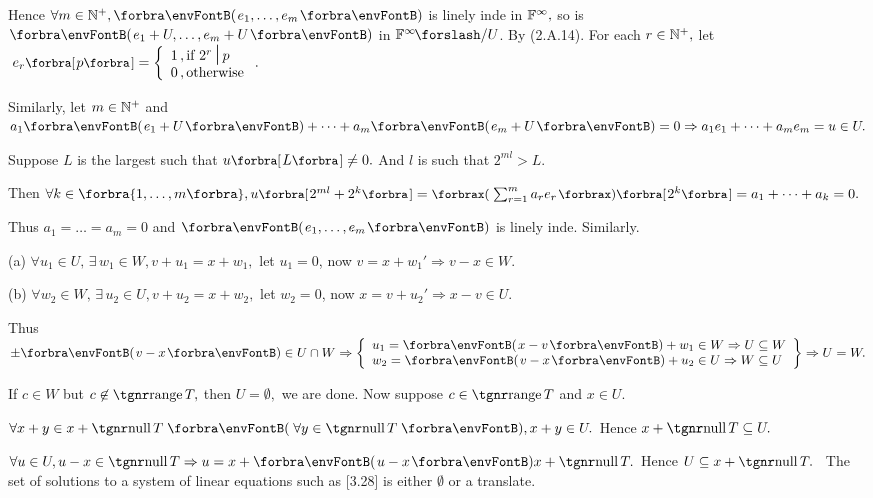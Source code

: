 \documentclass[a4paper, 11pt, UTF8]{article}
\begin{document}
\begin{large}
Hence $\forall m\in\Nbp,\Par{e_1,\dots,e_m}$ is linely inde in ${\mathbb{F}}^{\infty},$ so is $\Par{e_1+U,\dots,e_m+U}$ in $\Fbb^{\infty}\mySlash U$. By (2.A.14).\PfEnd\vspace{14pt}\quad
\Or For each $r\in{\mathbb{N}^+},$ let $\;e_r\Sbra{p}=\hMath[0pt]{l}{\left\{}{\right.}{1\,,\text{if }2^r\,\mid\,p\\0\,,\text{otherwise}}.$\vspace{4pt}\par\quad
Similarly, let $m\in{\mathbb{N}^+}$ and $a_1\Par{e_1+U}+\dots+a_m\Par{e_m+U}=0\Rightarrow a_1e_1+\dots+a_me_m=u\in U.$\vspace{4pt}\par\quad
Suppose $L$ is the largest such that $u\Sbra{L}\neq 0.$ And $l$ is such that $2^{ml}> L.$\vspace{6pt}\par\quad
Then $\forall k\in\Bra{1,\dots,m},u\Sbra{2^{ml}+2^k}=\XPar{\sum_{r=1}^m a_re_r}\Sbra{2^k}=a_1+\dots+a_k=0.$\vspace{6pt}\par\quad
Thus $a_1=\dots=a_m=0$ and $\Par{e_1,\dots,e_m}$ is linely inde. Similarly.\PfEnd
\SepLine

\par\quad
(a) $\forall u_1\in U,\,\exists\,w_1\in W,v+u_1=x+w_1,$ let $u_1=0$, now $v=x+w_1'\Rightarrow v-x\in W$.\par\quad
(b) $\forall w_2\in W,\,\exists\,u_2\in U,v+u_2=x+w_2,$ let $w_2=0$, now $x=v+u_2'\Rightarrow x-v\in U$.\par\quad
Thus $\pm\Par{v-x}\in U\cap W \Rightarrow\MathLeftrightBrace{l}{u_1=\Par{x-v}+w_1\in W\Rightarrow U\subseteq W\\w_2=\Par{v-x}+u_2\in U\Rightarrow W\subseteq U}\Rightarrow U=W.$\PfEnd
\SepLine

\SepLine

\par\quad
If $c\in W$ but $c\not\in\range T,$ then $U=\emptyset,$ we are done. Now suppose $c\in\range T$ and $x\in U.$\vspace{0pt}\par\quad
$\forall x+y\in x+\null T\;\Par{\,\forall y\in\null T\,},x+y\in U.$ Hence $x+\null T\subseteq U.$\vspace{0pt}\par\quad
$\forall u\in U,u-x\in\null T\Rightarrow u=x+\Par{u-x} x+\null T.$ Hence $U\subseteq x+\null T.$\PfEnd
\Corollary \,\,\,{\tgsl The set of solutions to a system of linear equations such as [3.28] is either $\emptyset$ or a translate.}\par
\SepLine


\end{large}
\end{document}
